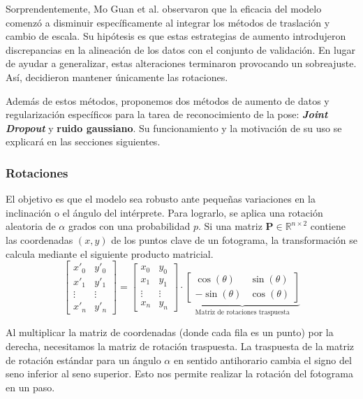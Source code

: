 Sorprendentemente, Mo Guan et al. \cite{MSKA} observaron que la eficacia del modelo comenzó a disminuir específicamente al integrar los métodos de traslación y cambio de escala.
Su hipótesis es que estas estrategias de aumento introdujeron discrepancias en la alineación de los datos con el conjunto de validación.
En lugar de ayudar a generalizar, estas alteraciones terminaron provocando un sobreajuste. Así, decidieron mantener únicamente las rotaciones.

Además de estos métodos, proponemos dos métodos de aumento de datos y regularización específicos para la tarea de reconocimiento de la pose: \textbf{\textit{Joint Dropout}} y \textbf{ruido gaussiano}.
Su funcionamiento y la motivación de su uso se explicará en las secciones siguientes.

\subsubsection*{Rotaciones}
El objetivo es que el modelo sea robusto ante pequeñas variaciones en la inclinación o el ángulo del intérprete.
Para lograrlo, se aplica una rotación aleatoria de $\alpha$ grados con una probabilidad $p$.
Si una matriz $\mathbf{P} \in \mathbb{R}^{n \times 2}$ contiene las coordenadas $(x, y)$ de los puntos clave de un fotograma, la transformación se calcula mediante el siguiente producto matricial.
\begin{equation*}
  \begin{bmatrix}
    x'_0 & y'_0\\
    x'_1 & y'_1 \\
    \vdots & \vdots\\
    x'_n & y'_n
    \end{bmatrix}
    =
    \begin{bmatrix}
    x_0 & y_0\\
    x_1 & y_1 \\
    \vdots & \vdots\\
    x_n & y_n
  \end{bmatrix}
\cdot
\underbrace{
  \begin{bmatrix}
    \cos(\theta) & \sin(\theta) \\
    -\sin(\theta) & \cos(\theta)
  \end{bmatrix}
}_{\text{Matriz de rotaciones traspuesta}}
\end{equation*}


Al multiplicar la matriz de coordenadas (donde cada fila es un punto) por la derecha, necesitamos la matriz de rotación traspuesta.
La traspuesta de la matriz de rotación estándar para un ángulo $\alpha$ en sentido antihorario cambia el signo del seno inferior al seno superior.
Esto nos permite realizar la rotación del fotograma en un paso.


